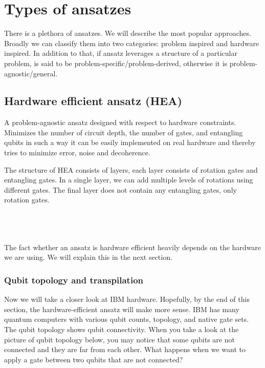\section{Types of ansatzes}
There is a plethora of ansatzes. We will describe the most popular approaches. Broadly we can classify them into two categories: problem inspired and hardware inspired. In addition to that, if ansatz leverages a structure of a particular problem, is said to be problem-specific/problem-derived, otherwise it is problem-agnostic/general. 

\subsection{Hardware efficient ansatz (HEA)}
A problem-agnostic ansatz designed with respect to hardware constraints. Minimizes the number of circuit depth, the number of gates, and entangling qubits in such a way it can be easily implemented on real hardware and thereby tries to minimize error, noise and decoherence.

The structure of HEA consists of layers, each layer consists of rotation gates and entangling gates. In a single layer, we can add multiple levels of rotations using different gates. The final layer does not contain any entangling gates, only rotation gates.

\\
\\
\\

The fact whether an ansatz is hardware efficient heavily depends on the hardware we are using. We will explain this in the next section.

\subsubsection{Qubit topology and transpilation}
Now we will take a closer look at IBM hardware. Hopefully, by the end of this section, the hardware-efficient ansatz will make more sense. IBM has many quantum computers with various qubit counts, topology, and native gate sets. The qubit topology shows qubit connectivity. When you take a look at the picture of qubit topology below, you may notice that some qubits are not connected and they are far from each other. What happens when we want to apply a gate between two qubits that are not connected? 


